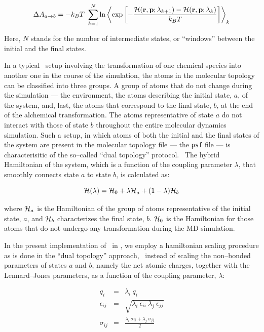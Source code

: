 \begin{equation}
\Delta A_{a \rightarrow b} = -k_B T \ \sum_{k = 1}^N \ln
\left< \exp\left[-\frac{{\cal H}({\bf r}, {\bf p}; \lambda_{k+1}) - 
                         {\cal H}({\bf r}, {\bf p}; \lambda_k)}
                        {k_B T}\right]
\right>_k
\end{equation}

Here, $N$ stands for the number of intermediate states, or ``windows''
between the initial and the final states.


In a typical \FEP\ setup involving the transformation
of one chemical species into another one in the course 
of the simulation, the atoms in the molecular topology can be 
classified into three groups. A group of atoms that do not change 
during the simulation --- \eg the environment,  
the atoms describing the initial state, $a$, of the system, and, last, the 
atoms that correspond to the final state, $b$, at the end of the 
alchemical transformation. 
The atoms representative of state $a$
do not interact with those of state $b$ throughout the 
entire molecular dynamics simulation. 
Such a setup, in which atoms of both the initial and the
final states of the system are present in the molecular topology file --- \ie 
the {\tt psf} file --- is characterisitic of the so--called ``dual topology'' 
protocol.~\cite{Axelsen.98}
The hybrid Hamiltonian of the system, which is a function of the
coupling parameter $\lambda$, that smoothly connects state $a$
to state $b$, is calculated as:

\begin{equation}
{\cal H}(\lambda) = {\cal H}_0 + \lambda {\cal H}_a + (1-\lambda) {\cal H}_b
\end{equation}

where ${\cal H}_a$ is the Hamiltonian of the group of atoms representative
of the initial state, $a$, and ${\cal H}_b$ characterizes the final state,
$b$. 
${\cal H}_0$ is the Hamiltonian for those atoms that do not undergo any 
transformation during the MD simulation.


In the present implementation of \FEP\ in \NAMD, we employ a hamiltonian
scaling procedure as is done in the ``dual topology''
approach,~\cite{Pearlman.93} \ie instead 
of scaling the non--bonded parameters of states $a$ and $b$, 
namely the net atomic charges, together with the Lennard--Jones parameters, 
as a function of the coupling parameter, $\lambda$:

\begin{eqnarray}
\nonumber
q_i &=& \lambda_i \ q_i \\[0.4cm]
\epsilon_{ij} &=& \sqrt{\lambda_i \ \epsilon_{ii} \ \lambda_j \ \epsilon_{jj}} \\[0.4cm]
\nonumber
\sigma_{ij} &=& \frac{\lambda_i \ \sigma_{ii} + \lambda_j \ \sigma_{jj}}{2} 
\end{eqnarray}


